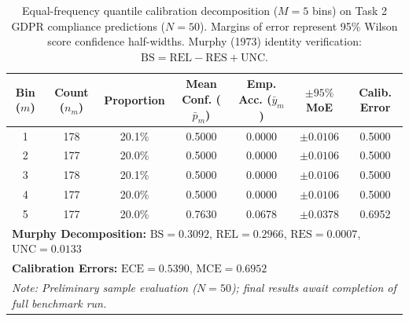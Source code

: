 \begin{table}[t]
\centering
\caption{Equal-frequency quantile calibration decomposition ($M=5$ bins) on Task 2 GDPR compliance predictions ($N=50$). Margins of error represent 95\% Wilson score confidence half-widths. Murphy (1973) identity verification: $\text{BS} = \text{REL} - \text{RES} + \text{UNC}$.}
\label{tab:calibration_decomposition}
\small
\begin{tabular}{ccccccc}
\toprule
\textbf{Bin ($m$)} & \textbf{Count ($n_m$)} & \textbf{Proportion} & \textbf{Mean Conf. ($\bar{p}_m$)} & \textbf{Emp. Acc. ($\bar{y}_m$)} & \textbf{$\pm 95\%$ MoE} & \textbf{Calib. Error} \\
\midrule
1 & 178 & 20.1\% & 0.5000 & 0.0000 & $\pm 0.0106$ & 0.5000 \\
2 & 177 & 20.0\% & 0.5000 & 0.0000 & $\pm 0.0106$ & 0.5000 \\
3 & 178 & 20.1\% & 0.5000 & 0.0000 & $\pm 0.0106$ & 0.5000 \\
4 & 177 & 20.0\% & 0.5000 & 0.0000 & $\pm 0.0106$ & 0.5000 \\
5 & 177 & 20.0\% & 0.7630 & 0.0678 & $\pm 0.0378$ & 0.6952 \\
\midrule
\multicolumn{7}{l}{\textbf{Murphy Decomposition:} $\text{BS} = 0.3092$, $\text{REL} = 0.2966$, $\text{RES} = 0.0007$, $\text{UNC} = 0.0133$} \\
\multicolumn{7}{l}{\textbf{Calibration Errors:} $\text{ECE} = 0.5390$, $\text{MCE} = 0.6952$} \\
\multicolumn{7}{l}{\textit{Note: Preliminary sample evaluation ($N=50$); final results await completion of full benchmark run.}} \\
\bottomrule
\end{tabular}
\end{table}
